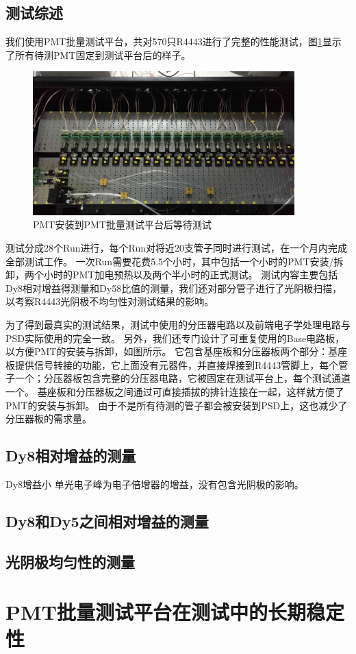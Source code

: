 \subsection{测试综述}
\label{sec:pmt_test:characterization_summary}
我们使用PMT批量测试平台，共对570只R4443进行了完整的性能测试，图\ref{fig:pmt_test:testbench_withpmt}显示了所有待测PMT固定到测试平台后的样子。
\begin{figure}[htbp]
	\centering
	\includegraphics[width=0.9\textwidth]{chap/pmt_test/fig/testbench_withpmts.jpg}
	\caption{PMT安装到PMT批量测试平台后等待测试}
	\label{fig:pmt_test:testbench_withpmt}
\end{figure}
测试分成28个Run进行，每个Run对将近20支管子同时进行测试，在一个月内完成全部测试工作。
一次Run需要花费5.5个小时，其中包括一个小时的PMT安装/拆卸，两个小时的PMT加电预热以及两个半小时的正式测试。
测试内容主要包括Dy8相对增益得测量和Dy58比值的测量，我们还对部分管子进行了光阴极扫描，以考察R4443光阴极不均匀性对测试结果的影响。

为了得到最真实的测试结果，测试中使用的分压器电路以及前端电子学处理电路与PSD实际使用的完全一致。
另外，我们还专门设计了可重复使用的Base电路板，以方便PMT的安装与拆卸，如图所示。
它包含基座板和分压器板两个部分：基座板提供信号转接的功能，它上面没有元器件，并直接焊接到R4443管脚上，每个管子一个；分压器板包含完整的分压器电路，它被固定在测试平台上，每个测试通道一个。
基座板和分压器板之间通过可直接插拔的排针连接在一起，这样就方便了PMT的安装与拆卸。
由于不是所有待测的管子都会被安装到PSD上，这也减少了分压器板的需求量。

\subsection{Dy8相对增益的测量}
\label{sec:pmt_test:relative_gain}
Dy8增益小
单光电子峰为电子倍增器的增益，没有包含光阴极的影响。


\subsection{Dy8和Dy5之间相对增益的测量}
\label{sec:pmt_test:dy58}

\subsection{光阴极均匀性的测量}
\label{sec:pmt_test:cathode_scanning}

\section{PMT批量测试平台在测试中的长期稳定性}
\label{sec:pmt_test:testbench_performance}

